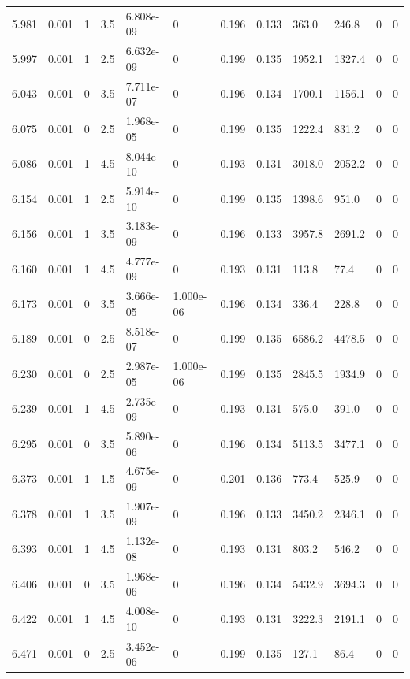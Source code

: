 \documentclass[preview]{standalone}
\begin{document}
{{{{{{\begin{tabular}{L{1.2cm}C{1.2cm} C{0.3cm}C{0.5cm} C{1.4cm}C{1.4cm} C{1.4cm}C{1.4cm} C{1.6cm}C{1.6cm} C{1.6cm}C{1.6cm}}
  5.981  &  0.001  & 1     & 3.5 &  6.808e-09  & 0  &  0.196&   0.133& 363.0 & 246.8   &  0 & 0  \\ 
  5.997  &  0.001  & 1     & 2.5 &  6.632e-09  & 0  &  0.199&   0.135& 1952.1 & 1327.4   &  0 & 0  \\ 
  6.043  &  0.001  & 0     & 3.5 &  7.711e-07  & 0  &  0.196&   0.134& 1700.1 & 1156.1   &  0 & 0  \\ 
  6.075  &  0.001  & 0     & 2.5 &  1.968e-05  & 0  &  0.199&   0.135& 1222.4 & 831.2   &  0 & 0  \\ 
  6.086  &  0.001  & 1     & 4.5 &  8.044e-10  & 0  &  0.193&   0.131& 3018.0 & 2052.2   &  0 & 0  \\ 
  6.154  &  0.001  & 1     & 2.5 &  5.914e-10  & 0  &  0.199&   0.135& 1398.6 & 951.0   &  0 & 0  \\ 
  6.156  &  0.001  & 1     & 3.5 &  3.183e-09  & 0  &  0.196&   0.133& 3957.8 & 2691.2   &  0 & 0  \\ 
  6.160  &  0.001  & 1     & 4.5 &  4.777e-09  & 0  &  0.193&   0.131& 113.8 & 77.4   &  0 & 0  \\ 
  6.173  &  0.001  & 0     & 3.5 &  3.666e-05  & 1.000e-06  &  0.196&   0.134& 336.4 & 228.8   &  0 & 0  \\ 
  6.189  &  0.001  & 0     & 2.5 &  8.518e-07  & 0  &  0.199&   0.135& 6586.2 & 4478.5   &  0 & 0  \\ 
  6.230  &  0.001  & 0     & 2.5 &  2.987e-05  & 1.000e-06  &  0.199&   0.135& 2845.5 & 1934.9   &  0 & 0  \\ 
  6.239  &  0.001  & 1     & 4.5 &  2.735e-09  & 0  &  0.193&   0.131& 575.0 & 391.0   &  0 & 0  \\ 
  6.295  &  0.001  & 0     & 3.5 &  5.890e-06  & 0  &  0.196&   0.134& 5113.5 & 3477.1   &  0 & 0  \\ 
  6.373  &  0.001  & 1     & 1.5 &  4.675e-09  & 0  &  0.201&   0.136& 773.4 & 525.9   &  0 & 0  \\ 
  6.378  &  0.001  & 1     & 3.5 &  1.907e-09  & 0  &  0.196&   0.133& 3450.2 & 2346.1   &  0 & 0  \\ 
  6.393  &  0.001  & 1     & 4.5 &  1.132e-08  & 0  &  0.193&   0.131& 803.2 & 546.2   &  0 & 0  \\ 
  6.406  &  0.001  & 0     & 3.5 &  1.968e-06  & 0  &  0.196&   0.134& 5432.9 & 3694.3   &  0 & 0  \\ 
  6.422  &  0.001  & 1     & 4.5 &  4.008e-10  & 0  &  0.193&   0.131& 3222.3 & 2191.1   &  0 & 0  \\ 
  6.471  &  0.001  & 0     & 2.5 &  3.452e-06  & 0  &  0.199&   0.135& 127.1 & 86.4   &  0 & 0  \\ 

\end{tabular}}}}}}}
\end{document}
